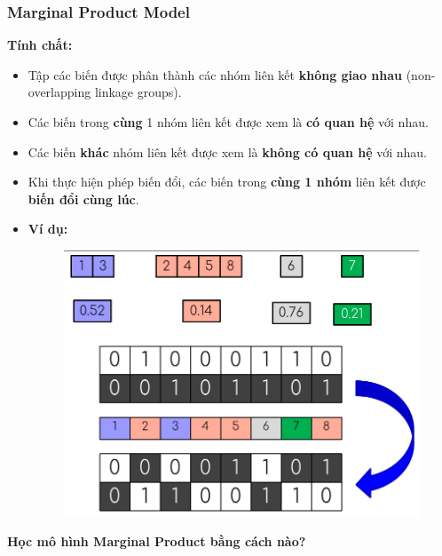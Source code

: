 \documentclass{book}
\begin{document}
            \subsubsection{Marginal Product Model}
            \textbf{Tính chất:}
            \begin{itemize}
                \item Tập các biến được phân thành các nhóm liên kết \textbf{không giao nhau} (non-overlapping linkage groups).
                \item Các biến trong \textbf{cùng} 1 nhóm liên kết được xem là \textbf{có quan hệ} với nhau.
                \item Các biến \textbf{khác} nhóm liên kết được xem là \textbf{không có quan hệ} với nhau.
                \item Khi thực hiện phép biến đổi, các biến trong \textbf{cùng 1 nhóm} liên kết được \textbf{biến đổi cùng lúc}.
                \item \textbf{Ví dụ:}
                \begin{figure}[H]
                    \centering
                    \includegraphics[width=0.7\linewidth]{images/MPM1.png}
                    \label{fig:MPM1}
                \end{figure}
            \end{itemize}
            \textbf{Học mô hình Marginal Product bằng cách nào?}
\end{document}
